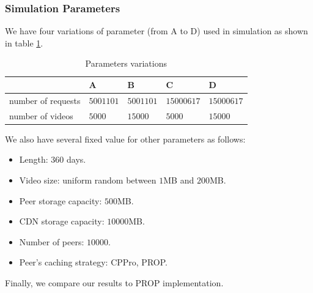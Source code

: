 \documentclass[10pt,final,journal,a4paper]{IEEEtran}
\begin{document}




\subsubsection{Simulation Parameters}
We have four variations of parameter (from A to D) used in simulation as shown in table \ref{tab:parameters}.
\begin{table}[!t]
\caption{Parameters variations}
\label{tab:parameters}
\centering

\begin{tabular}{|l|l|l|l|l|}
\hline
  & A & B & C & D \\ \hline
number of requests & $5001101$ & $5001101$ & $15000617$ & $15000617$ \\ \hline
number of videos  & $5000$ & $15000$ & $5000$ & $15000$ \\ \hline
\end{tabular}
\end{table}

We also have several fixed value for other parameters as follows: 
\begin{itemize}
\item Length: $360$ days.
\item Video size: uniform random between $1$MB and $200$MB.
\item Peer storage capacity: $500$MB.
\item CDN storage capacity: $10000$MB.
\item Number of peers: $10000$.
\item Peer's caching strategy: CPPro, PROP.
\end{itemize}
Finally, we compare our results to PROP \cite{1613869} implementation.







\end{document}
